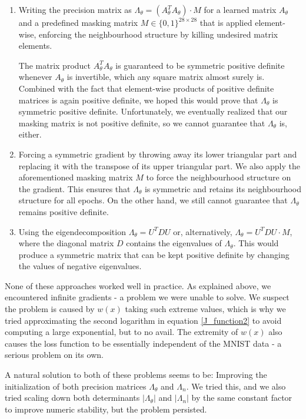 \documentclass[a4paper]{article}
\theoremstyle{definition}
\theoremstyle{plain}
\begin{document}
\begin{enumerate}
\item Writing the precision matrix as $\Lambda_\theta = (A_\theta ^T A_\theta) \cdot M$ for a learned matrix $A_\theta$ and a pre\-defined masking matrix $M \in \{0,1\}^{28\times 28}$ that is applied element-wise, enforcing the neighbourhood structure by killing undesired matrix elements.

The matrix product $A_\theta^T A_\theta$ is guaranteed to be symmetric positive definite whenever $A_\theta$ is invertible, which any square matrix almost surely is. Combined with the fact that element-wise products of positive definite matrices is again positive definite, we hoped this would prove that $\Lambda_\theta$ is symmetric positive definite. Unfortunately, we eventually realized that our masking matrix is not positive definite, so we cannot guarantee that $\Lambda_\theta$ is, either.

\item Forcing a symmetric gradient by throwing away its lower triangular part and replacing it with the transpose of its upper triangular part. We also apply the aforementioned masking matrix $M$ to force the neighbourhood structure on the gradient. This ensures that $\Lambda_\theta$ is symmetric and retains its neighbourhood structure for all epochs. On the other hand, we still cannot guarantee that $\Lambda_\theta$ remains positive definite.

\item Using the eigendecomposition $\Lambda_\theta = U^T D U$ or, alternatively, $\Lambda_\theta = U^T D U \cdot M$, where the diagonal matrix $D$ contains the eigenvalues of $\Lambda_\theta$. This would produce a symmetric matrix that can be kept positive definite by changing the values of negative eigenvalues.
\end{enumerate}
None of these approaches worked well in practice. As explained above, we encountered infinite gradients - a problem we were unable to solve. We suspect the problem is caused by $w(x)$ taking such extreme values, which is why we tried approximating the second logarithm in equation \eqref{J_function2} to avoid computing a large exponential, but to no avail. The extremity of $w(x)$ also causes the loss function to be essentially independent of the MNIST data - a serious problem on its own.

A natural solution to both of these problems seems to be: Improving the initialization of both precision matrices $\Lambda_\theta$ and $\Lambda_n$. We tried this, and we also tried scaling down both determinants $|\Lambda_\theta|$ and $|\Lambda_n|$ by the same constant factor to improve numeric stability, but the problem persisted.
\end{document}
